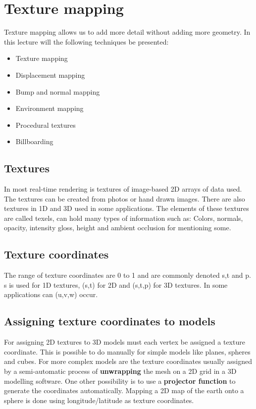 \section{Texture mapping}
Texture mapping allows us to add more detail without adding more geometry. In this lecture will the following techniques be presented:

	\begin{itemize}
		\item Texture mapping
		\item Displacement mapping
		\item Bump and normal mapping
		\item Environment mapping
		\item Procedural textures
		\item Billboarding
	\end{itemize}


	\subsection*{Textures}
	In most real-time rendering is textures of image-based 2D arrays of data used. The textures can be created from photos or hand drawn images. There are also textures in 1D and 3D used in some applications. The elements of these textures are called texels, can hold many types of information such as: Colors, normals, opacity, intensity gloss, height and ambient occlusion for mentioning some. 

	\subsection*{Texture coordinates}
	The range of texture coordinates are 0 to 1 and are commonly denoted s,t and p. s is used for 1D textures, (s,t) for 2D and (s,t,p) for 3D textures. In some applications can (u,v,w) occur. 

	\subsection*{Assigning texture coordinates to models}
	For assigning 2D textures to 3D models must each vertex be assigned a texture coordinate. This is possible to do manually for simple models like planes, spheres and cubes. For more complex models are the texture coordinates usually assigned by a semi-automatic process of \textbf{unwrapping} the mesh on a 2D grid in a 3D modelling software. One other possibility is to use a \textbf{projector function} to generate the coordinates automatically. Mapping a 2D map of the earth onto a sphere is done using longitude/latitude as texture coordinates. 

